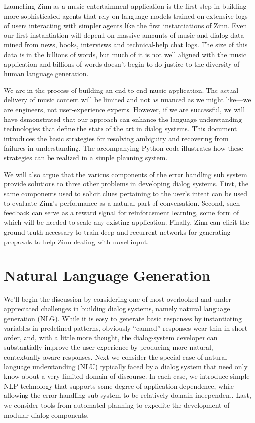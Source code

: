 \documentclass[letterpaper,11pt]{article}
\begin{document}
Launching Zinn as a music entertainment application is the first step in building more sophisticated agents that rely on language models trained on extensive logs of users interacting with simpler agents like the first instantiations of Zinn. Even our first instantiation will depend on massive amounts of music and dialog data mined from news, books, interviews and technical-help chat logs. The size of this data is in the billions of words, but much of it is not well aligned with the music application and billions of words doesn't begin to do justice to the diversity of human language generation. 

We are in the process of building an end-to-end music application. The actual delivery of music content will be limited and not as nuanced as we might like---we are engineers, not user-experience experts. However, if we are successful, we will have demonstrated that our approach can enhance the language understanding technologies that define the state of the art in dialog systems. This document introduces the basic strategies for resolving ambiguity and recovering from failures in understanding. The accompanying Python code illustrates how these strategies can be realized in a simple planning system. 

We will also argue that the various components of the error handling sub system provide solutions to three other problems in developing dialog systems. First, the same components used to solicit clues pertaining to the user's intent can be used to evaluate Zinn's performance as a natural part of conversation. Second, such feedback can serve as a reward signal for reinforcement learning, some form of which will be needed to scale any existing application. Finally, Zinn can elicit the ground truth necessary to train deep and recurrent networks for generating proposals to help Zinn dealing with novel input.

\section*{Natural Language Generation}

We'll begin the discussion by considering one of most overlooked and under-appreciated challenges in building dialog systems, namely natural language generation (NLG). While it is easy to generate basic responses by instantiating variables in predefined patterns, obviously ``canned'' responses wear thin in short order, and, with a little more thought, the dialog-system developer can substantially improve the user experience by producing more natural, contextually-aware responses. Next we consider the special case of natural language understanding (NLU) typically faced by a dialog system that need only know about a very limited domain of discourse. In each case, we introduce simple NLP technology that supports some degree of application dependence, while allowing the error handling sub system to be relatively domain independent. Last, we consider tools from automated planning to expedite the development of modular dialog components. 
\end{document}

